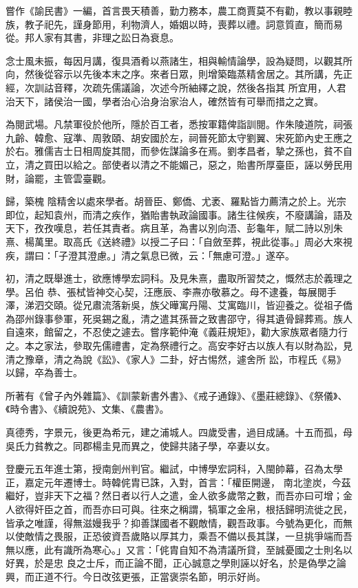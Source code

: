\begin{pinyinscope}
 嘗作《諭民書》一編，首言畏天積善，勤力務本，農工商賈莫不有勸，教以事親睦族，教子祀先，謹身節用，利物濟人，婚姻以時，喪葬以禮。詞意質直，簡而易從。邦人家有其書，非理之訟日為衰息。



 念士風未振，每因月講，復具酒肴以燕諸生，相與輸情論學，設為疑問，以觀其所向，然後從容示以先後本末之序。來者日眾，則增築臨蒸精舍居之。其所講，先正經，次訓詁音釋，次疏先儒議論，次述今所紬繹之說，然後各指其
 所宜用，人君治天下，諸侯治一國，學者治心治身治家治人，確然皆有可舉而措之之實。



 為閱武場。凡禁軍役於他所，隱於百工者，悉按軍籍俾詣訓閱。作朱陵道院，祠張九齡、韓愈、寇準、周敦頤、胡安國於左，祠晉死節太守劉翼、宋死節內史王應之於右。雅儒吉士日相周旋其間，而參佐謀論多在焉。劉孝昌者，摯之孫也，貧不自立，清之買田以給之。部使者以清之不能媚己，惡之，貽書所厚臺臣，誣以勞民用財，論罷，主管雲臺觀。



 歸，築槐
 陰精舍以處來學者。胡晉臣、鄭僑、尤袤、羅點皆力薦清之於上。光宗即位，起知袁州，而清之疾作，猶貽書執政論國事。諸生往候疾，不廢講論，語及天下，孜孜嘆息，若任其責者。病且革，為書以別向浯、彭龜年，賦二詩以別朱熹、楊萬里。取高氏《送終禮》以授二子曰：「自斂至葬，視此從事。」周必大來視疾，謂曰：「子澄其澄慮。」清之氣息已微，云：「無慮可澄。」遂卒。



 初，清之既舉進士，欲應博學宏詞科。及見朱熹，盡取所習焚之，慨然志於義理之學。呂伯
 恭、張栻皆神交心契，汪應辰、李燾亦敬慕之。母不逮養，每展閱手澤，涕泗交頤。從兄肅流落新吳，族父曄寓丹陽、艾寓臨川，皆迎養之。從祖子僑為邵州錄事參軍，死吳錫之亂，清之遣其孫晉之致書邵守，得其遺骨歸葬焉。族人自遠來，館留之，不忍使之遽去。嘗序範仲淹《義莊規矩》，勸大家族眾者隨力行之。本之家法，參取先儒禮書，定為祭禮行之。高安李好古以族人有以財為訟，見清之豫章，清之為說《訟》、《家人》二卦，好古惕然，遽舍所
 訟，市程氏《易》以歸，卒為善士。



 所著有《曾子內外雜篇》、《訓蒙新書外書》、《戒子通錄》、《墨莊總錄》、《祭儀》、《時令書》、《續說苑》、文集、《農書》。



 真德秀，字景元，後更為希元，建之浦城人。四歲受書，過目成誦。十五而孤，母吳氏力貧教之。同郡楊圭見而異之，使歸共諸子學，卒妻以女。



 登慶元五年進士第，授南劍州判官。繼試，中博學宏詞科，入閩帥幕，召為太學正，嘉定元年遷博士。時韓侂胄已誅，入對，首言：「權臣開邊，
 南北塗炭，今茲繼好，豈非天下之福？然日者以行人之遣，金人欲多歲幣之數，而吾亦曰可增；金人欲得奸臣之首，而吾亦曰可與。往來之稱謂，犒軍之金帛，根括歸明流徙之民，皆承之唯謹，得無滋嫚我乎？抑善謀國者不觀敵情，觀吾政事。今號為更化，而無以使敵情之畏服，正恐彼資吾歲賂以厚其力，乘吾不備以長其謀，一旦挑爭端而吾無以應，此有識所為寒心。」又言：「侂胄自知不為清議所貸，至誠憂國之士則名以好異，於是忠
 良之士斥，而正論不聞，正心誠意之學則誣以好名，於是偽學之論興，而正道不行。今日改弦更張，正當褒崇名節，明示好尚。




\end{pinyinscope}
